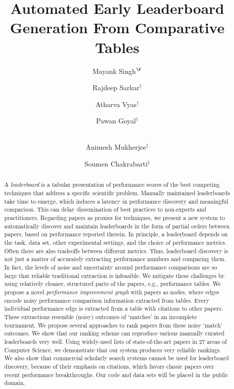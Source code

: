 \documentclass[runningheads]{llncs}
\begin{document}
\pagestyle{plain} \thispagestyle{plain}

\def\titletext{Automated Early Leaderboard Generation From Comparative Tables}
\title{\titletext}
\author{Mayank Singh$^\P$ \and Rajdeep Sarkar$^\dagger$ \and
  Atharva Vyas$^\dagger$ \and Pawan Goyal$^\dagger$ \and \\
  Animesh Mukherjee$^\dagger$ \and Soumen Chakrabarti$^\ddag$}
\maketitle

\begin{abstract}
A \emph{leaderboard} is a tabular presentation of performance scores of the best competing techniques that address a specific scientific problem. Manually maintained leaderboards take time to emerge, which induces a latency in performance discovery and meaningful comparison.  This can delay dissemination of best practices to non-experts and practitioners.  Regarding papers as proxies for techniques, we present a new system to automatically discover and maintain leaderboards in the form of partial orders between papers, based on performance reported therein.  In principle, a leaderboard depends on the task, data set, other experimental settings, and the choice of performance metrics.  Often there are also tradeoffs between different metrics.  Thus, leaderboard discovery is not just a matter of accurately extracting performance numbers and comparing them.  In fact, the levels of noise and uncertainty around performance comparisons are so large that reliable traditional extraction is infeasible.  We mitigate these challenges by using relatively cleaner, structured parts of the papers, e.g., performance tables.  We propose a novel \emph{performance improvement graph} with papers as nodes, where edges encode noisy performance comparison information extracted from tables.  Every individual performance edge is extracted from a table with citations to other papers. These extractions resemble (noisy) outcomes of `matches' in an incomplete tournament.  We propose several approaches to rank papers from these noisy `match' outcomes.  We show that our ranking scheme can reproduce various manually curated leaderboards very well. Using widely-used lists of state-of-the-art papers in 27 areas of Computer Science, we demonstrate that our system produces very reliable rankings.  We also show that commercial scholarly search systems cannot be used for leaderboard discovery, because of their emphasis on citations, which favors classic papers over recent performance breakthroughs.  Our code and data sets will be placed in the public domain.
\end{abstract}
\end{document}
